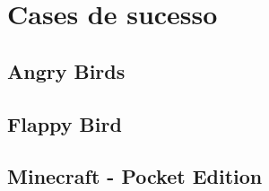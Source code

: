 
\chapter{Cases de sucesso}
\label{cap:caseSucesso}





\section{Angry Birds}




\section{Flappy Bird}




\section{Minecraft - Pocket Edition}


